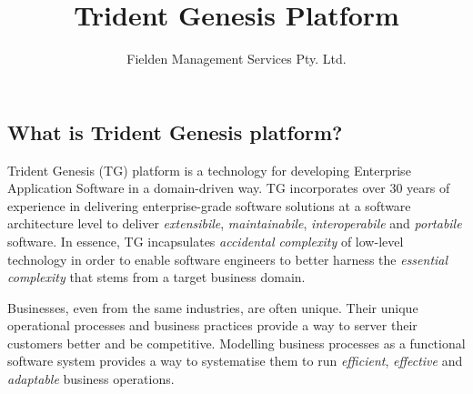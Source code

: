 \documentclass[a4paper,10pt,twocolumn,oneside,openright,final]{memoir}
\title{Trident Genesis Platform}
\author{Fielden Management Services Pty. Ltd.}
\begin{document}

\subsection*{What is Trident Genesis platform?}
  Trident Genesis (TG) platform is a technology for developing Enterprise Application Software in a domain-driven way.
  TG incorporates over 30 years of experience in delivering enterprise-grade software solutions at a software architecture level to deliver \emph{extensibile}, \emph{maintainabile}, \emph{interoperabile} and \emph{portabile} software.
  In essence, TG incapsulates \emph{accidental complexity} of low-level technology in order to enable software engineers to better harness the 
  \emph{essential complexity} that stems from a target business domain.
 
  \vspace{3 mm}
  \noindent Businesses, even from the same industries, are often unique. 
  Their unique operational processes and business practices provide a way to server their customers better and be competitive.
  Modelling business processes as a functional software system provides a way to systematise them to run \emph{efficient}, \emph{effective} and \emph{adaptable} business operations.

\begin{figure}[!h]
    \vspace{-5pt} 
    \centering    
    \vspace{0pt} 
  \end{figure}
\end{document}

